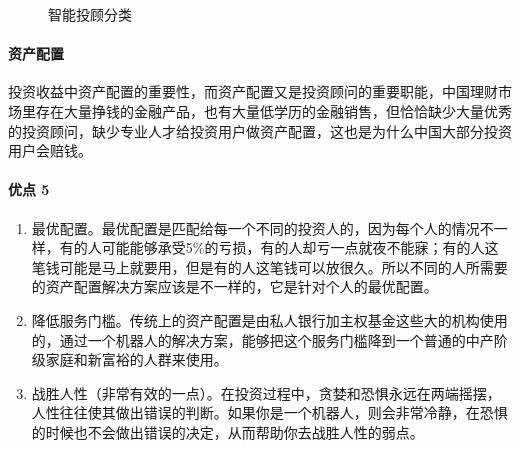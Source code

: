 \documentclass[letterpaper,11pt,english]{sphinxmanual}
\begin{document}
\begin{center}
{{\begin{figure}[H]
\noindent{}
\caption{智能投顾分类\sphinxfootnotemark[960]}\label{\detokenize{chapter_AI+Finance/Robo-Advisor:id9}}\end{figure}
%
\begin{footnotetext}[960]\sphinxAtStartFootnote
{}
%
\end{footnotetext}\ignorespaces 

\paragraph{资产配置}
\label{\detokenize{chapter_AI+Finance/Robo-Advisor:id6}}
投资收益中资产配置的重要性，而资产配置又是投资顾问的重要职能，中国理财市场里存在大量挣钱的金融产品，也有大量低学历的金融销售，但恰恰缺少大量优秀的投资顾问，缺少专业人才给投资用户做资产配置，这也是为什么中国大部分投资用户会赔钱。
%
\begin{footnote}[961]\sphinxAtStartFootnote
{}
%
\end{footnote}


\paragraph{优点 5\sphinxfootnotemark[962]}
\label{\detokenize{chapter_AI+Finance/Robo-Advisor:id7}}%
\begin{footnotetext}[962]\sphinxAtStartFootnote
{}
%
\end{footnotetext}\ignorespaces \begin{enumerate}
%
\item {} 
最优配置。最优配置是匹配给每一个不同的投资人的，因为每个人的情况不一样，有的人可能能够承受5\%的亏损，有的人却亏一点就夜不能寐；有的人这笔钱可能是马上就要用，但是有的人这笔钱可以放很久。所以不同的人所需要的资产配置解决方案应该是不一样的，它是针对个人的最优配置。

\item {} 
降低服务门槛。传统上的资产配置是由私人银行加主权基金这些大的机构使用的，通过一个机器人的解决方案，能够把这个服务门槛降到一个普通的中产阶级家庭和新富裕的人群来使用。

\item {} 
战胜人性（非常有效的一点）。在投资过程中，贪婪和恐惧永远在两端摇摆，人性往往使其做出错误的判断。如果你是一个机器人，则会非常冷静，在恐惧的时候也不会做出错误的决定，从而帮助你去战胜人性的弱点。


\end{enumerate}}}
\end{center}
\end{document}

